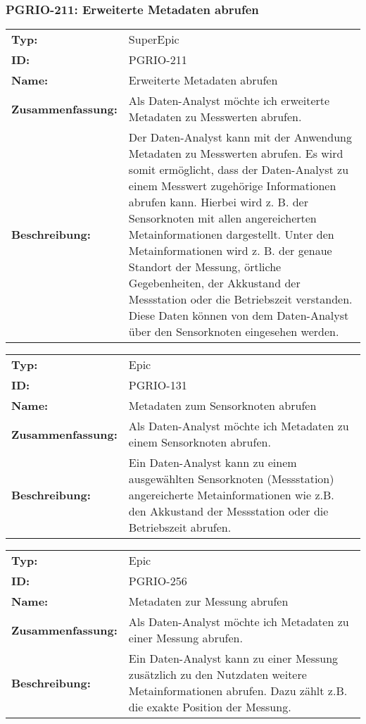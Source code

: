 	\subsubsection{PGRIO-211: Erweiterte Metadaten abrufen} 
\begin{flushleft} 
\begin{tabular}{@{}lp{100mm}} 
\textbf{Typ:} & SuperEpic \\ 
\textbf{ID:} & PGRIO-211 \\ 
\textbf{Name:} & Erweiterte Metadaten abrufen \\ 
\textbf{Zusammenfassung:} & Als Daten-Analyst möchte ich erweiterte Metadaten zu Messwerten abrufen. \\ 
\textbf{Beschreibung:} & Der Daten-Analyst kann mit der Anwendung Metadaten zu Messwerten abrufen. Es wird somit ermöglicht, dass der Daten-Analyst zu einem Messwert zugehörige Informationen abrufen kann. Hierbei wird z. B. der Sensorknoten mit allen angereicherten Metainformationen dargestellt. Unter den Metainformationen wird z. B. der genaue Standort der Messung, örtliche Gegebenheiten, der Akkustand der Messstation oder die Betriebszeit verstanden. Diese Daten können von dem Daten-Analyst über den Sensorknoten eingesehen werden. \\ 
\end{tabular} 
\end{flushleft} 

		\begin{flushleft} 
\begin{tabular}{@{}lp{100mm}} 
\textbf{Typ:} & Epic \\ 
\textbf{ID:} & PGRIO-131 \\ 
\textbf{Name:} & Metadaten zum Sensorknoten abrufen \\ 
\textbf{Zusammenfassung:} & Als Daten-Analyst möchte ich Metadaten zu einem Sensorknoten abrufen. \\ 
\textbf{Beschreibung:} & Ein Daten-Analyst kann zu einem ausgewählten Sensorknoten (Messstation) angereicherte Metainformationen wie z.B. den Akkustand der Messstation oder die Betriebszeit abrufen. \\ 
\end{tabular} 
\end{flushleft} 

		\begin{flushleft} 
\begin{tabular}{@{}lp{100mm}} 
\textbf{Typ:} & Epic \\ 
\textbf{ID:} & PGRIO-256 \\ 
\textbf{Name:} & Metadaten zur Messung abrufen \\ 
\textbf{Zusammenfassung:} & Als Daten-Analyst möchte ich Metadaten zu einer Messung abrufen. \\ 
\textbf{Beschreibung:} & Ein Daten-Analyst kann zu einer Messung zusätzlich zu den Nutzdaten weitere Metainformationen abrufen. Dazu zählt z.B. die exakte Position der Messung. \\ 
\end{tabular} 
\end{flushleft} 

